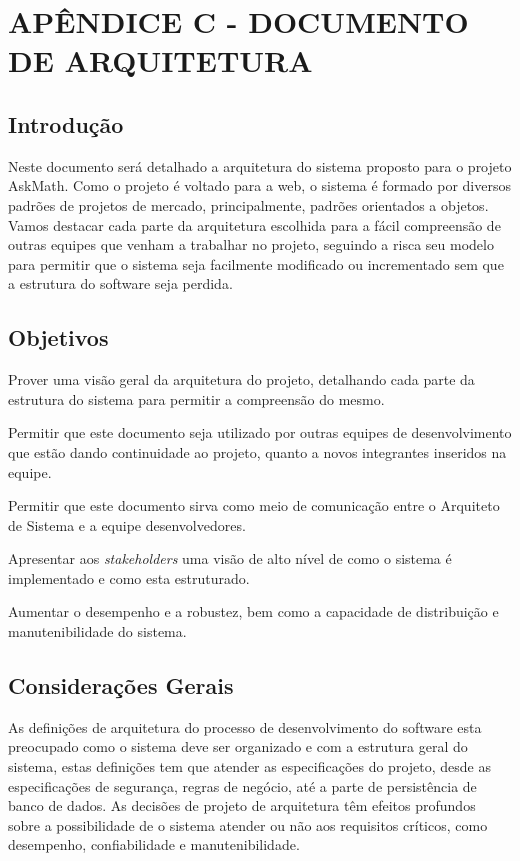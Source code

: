 \chapter*{APÊNDICE C - DOCUMENTO DE ARQUITETURA}\label{apendice_arquitetura}


\section{Introdução}
Neste documento será detalhado a arquitetura do sistema proposto para o projeto 
AskMath. Como o projeto é voltado para a web, o sistema é formado por diversos 
padrões de projetos de mercado, principalmente, padrões orientados a objetos. 
Vamos destacar cada parte da arquitetura escolhida para a fácil compreensão de 
outras equipes que venham a trabalhar no projeto, seguindo a risca seu modelo 
para permitir que o sistema seja facilmente modificado ou incrementado sem que a 
estrutura do software seja perdida.

\section{Objetivos}
\begin{alineascomponto}
	\item Prover uma visão geral da arquitetura do projeto, detalhando cada 
parte da estrutura do sistema para permitir a compreensão do mesmo.
    \item Permitir que este documento seja utilizado por outras equipes de 
desenvolvimento que estão dando continuidade ao projeto, quanto a novos 
integrantes inseridos na equipe.
    \item Permitir que este documento sirva como meio de comunicação entre o 
Arquiteto de Sistema e a equipe desenvolvedores.
    \item Apresentar aos \textit{stakeholders} uma visão de alto nível de como o 
sistema é implementado e como esta estruturado.
    \item Aumentar o desempenho e a robustez, bem como a capacidade de 
distribuição e manutenibilidade do sistema.
\end{alineascomponto}

\section{Considerações Gerais}
As definições de arquitetura do processo de desenvolvimento do software esta 
preocupado como o sistema deve ser organizado e com a estrutura geral do 
sistema, estas definições tem que atender as especificações do projeto, desde as 
especificações de segurança, regras de negócio, até a parte de persistência de 
banco de dados. As decisões de projeto de arquitetura têm efeitos profundos 
sobre a possibilidade de o sistema atender ou não aos requisitos críticos, como 
desempenho, confiabilidade e manutenibilidade.

